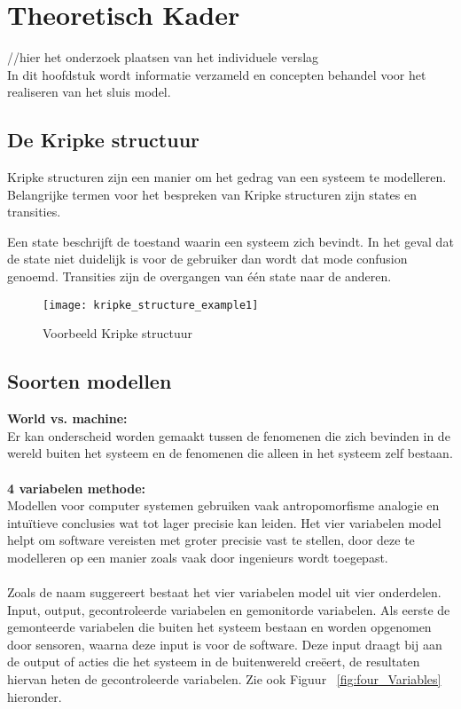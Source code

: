 \section{Theoretisch Kader}
//hier het onderzoek plaatsen van het individuele verslag \\
In dit hoofdstuk wordt informatie verzameld en concepten behandel voor het realiseren van het sluis model.

\subsection{De Kripke structuur}

Kripke structuren zijn een manier om het gedrag van een systeem te modelleren. Belangrijke termen voor het bespreken van Kripke structuren zijn states en transities. \newline

Een state beschrijft de toestand waarin een systeem zich bevindt. In het geval dat de state niet duidelijk is voor de gebruiker dan wordt dat mode confusion genoemd. Transities zijn de overgangen van één state naar de anderen. 

\begin{figure}[!h]
	\centering
	\texttt{[image: kripke\_structure\_example1]}
    \caption{Voorbeeld Kripke structuur}
\end{figure}

\subsection{Soorten modellen} \label{SoortenModellen}

\textbf{World vs. machine:} 
\\
Er kan onderscheid worden gemaakt tussen de fenomenen die zich bevinden in de wereld buiten het systeem en de fenomenen die alleen in het systeem zelf bestaan. \\\\
\textbf{4 variabelen methode:}
\\
Modellen voor computer systemen gebruiken vaak antropomorfisme analogie en intuïtieve conclusies wat tot lager precisie kan leiden. Het vier variabelen model helpt om software vereisten met groter precisie vast te stellen, door deze te modelleren op een manier zoals vaak door ingenieurs wordt toegepast. \cite{parnas1995functional} 
\\\\
Zoals de naam suggereert bestaat het vier variabelen model uit vier onderdelen. Input, output, gecontroleerde variabelen en gemonitorde variabelen. Als eerste de gemonteerde variabelen die buiten het systeem bestaan en worden opgenomen door sensoren, waarna deze input is voor de software. Deze input draagt bij aan de output of acties die het systeem in de buitenwereld creëert, de resultaten hiervan heten de gecontroleerde variabelen. Zie ook Figuur ~\ref{fig:four_Variables} hieronder.


